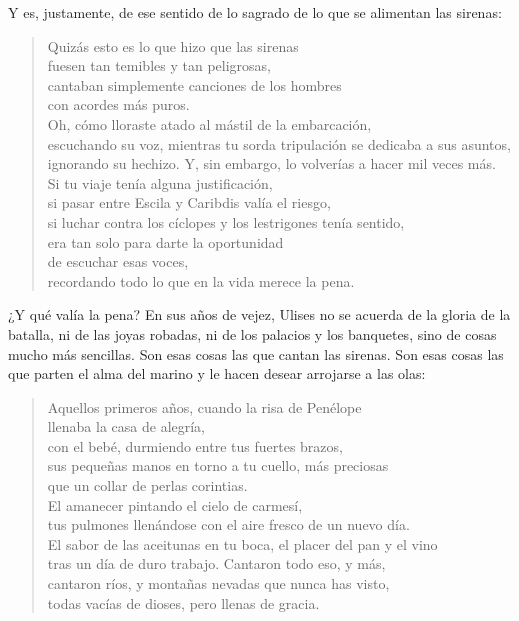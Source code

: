Y es, justamente, de ese sentido de lo sagrado de lo que se alimentan las sirenas:

\begin{verse}
Quizás esto es lo que hizo que las sirenas\\
fuesen tan temibles y tan peligrosas,\\
cantaban simplemente canciones de los hombres\\
con acordes más puros.\\
Oh, cómo lloraste atado al mástil de la embarcación,\\
escuchando su voz, mientras tu sorda tripulación se dedicaba a sus asuntos,\\
ignorando su hechizo. Y, sin embargo, lo volverías a hacer mil veces más.\\
Si tu viaje tenía alguna justificación,\\
si pasar entre Escila y Caribdis valía el riesgo,\\
si luchar contra los cíclopes y los lestrigones tenía sentido,\\
era tan solo para darte la oportunidad\\
de escuchar esas voces,\\
recordando todo lo que en la vida merece la pena.
\end{verse}

¿Y qué valía la pena? En sus años de vejez, Ulises no se acuerda de la gloria de la batalla, ni de las joyas robadas, ni de los palacios y los banquetes, sino de cosas mucho más sencillas. Son esas cosas las que cantan las sirenas. Son esas cosas las que parten el alma del marino y le hacen desear arrojarse a las olas:

\begin{verse}
Aquellos primeros años, cuando la risa de Penélope\\
llenaba la casa de alegría,\\
con el bebé, durmiendo entre tus fuertes brazos,\\
sus pequeñas manos en torno a tu cuello, más preciosas\\
que un collar de perlas corintias.\\
El amanecer pintando el cielo de carmesí,\\
tus pulmones llenándose con el aire fresco de un nuevo día.\\
El sabor de las aceitunas en tu boca, el placer del pan y el vino\\
tras un día de duro trabajo. Cantaron todo eso, y más,\\
cantaron ríos, y montañas nevadas que nunca has visto,\\
todas vacías de dioses, pero llenas de gracia.
\end{verse}

